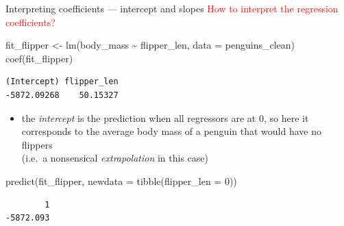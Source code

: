 \documentclass[
  10pt,
  ignorenonframetext,
  aspectratio=169,
  t]{beamer}
\newenvironment{Shaded}{\begin{snugshade}}{\end{snugshade}}
\newcommand{\AttributeTok}[1]{\textcolor[rgb]{0.40,0.45,0.13}{#1}}
\newcommand{\DecValTok}[1]{\textcolor[rgb]{0.68,0.00,0.00}{#1}}
\newcommand{\FunctionTok}[1]{\textcolor[rgb]{0.28,0.35,0.67}{#1}}
\newcommand{\NormalTok}[1]{\textcolor[rgb]{0.00,0.23,0.31}{#1}}
\newcommand{\OtherTok}[1]{\textcolor[rgb]{0.00,0.23,0.31}{#1}}
\newcommand{\SpecialCharTok}[1]{\textcolor[rgb]{0.37,0.37,0.37}{#1}}
\providecommand{\tightlist}{%
  \setlength{\itemsep}{0pt}\setlength{\parskip}{0pt}}
\newcommand{\blueit}[1]{\textcolor{bluebeamer}{\emph{#1}}}
\begin{document}
\begin{frame}[fragile]{Interpreting coefficients --- intercept and
slopes}
\protect{}\label{interpreting-coefficients-intercept-and-slopes}
\textcolor{red}{How to interpret the regression coefficients?}

\footnotesize

\begin{Shaded}
\begin{Highlighting}[]
\NormalTok{fit\_flipper }\OtherTok{\textless{}{-}} \FunctionTok{lm}\NormalTok{(body\_mass }\SpecialCharTok{\textasciitilde{}}\NormalTok{ flipper\_len, }\AttributeTok{data =}\NormalTok{ penguins\_clean)}
\FunctionTok{coef}\NormalTok{(fit\_flipper)}
\end{Highlighting}
\end{Shaded}

\begin{verbatim}
(Intercept) flipper_len 
-5872.09268    50.15327 
\end{verbatim}

\normalsize

\pause

\begin{itemize}
\tightlist
\item
  the \blueit{intercept} is the prediction when all regressors are at 0,
  so here it corresponds to the average body mass of a penguin that
  would have no flippers\\
  (i.e.~a nonsensical \blueit{extrapolation} in this case)
\end{itemize}

\footnotesize

\begin{Shaded}
\begin{Highlighting}[]
\FunctionTok{predict}\NormalTok{(fit\_flipper, }\AttributeTok{newdata =} \FunctionTok{tibble}\NormalTok{(}\AttributeTok{flipper\_len =} \DecValTok{0}\NormalTok{))}
\end{Highlighting}
\end{Shaded}

\begin{verbatim}
        1 
-5872.093 
\end{verbatim}

\normalsize
\end{frame}
\end{document}
